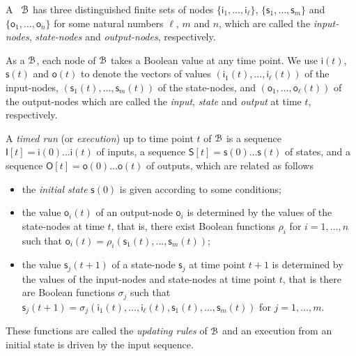 A \BCN\  ${\mathcal{B}}$ has three distinguished finite sets of nodes $\{\mathsf{i}_1,\ldots, \mathsf{i}_\ell\}$, $\{\mathsf{s}_1,\ldots,\mathsf{s}_m\}$ and $\{\mathsf{o}_1,\ldots, \mathsf{o}_n\}$ for some natural numbers $\ell$, $m$ and $n$, which are called the {\em input-nodes}, {\em state-nodes}  and {\em output-nodes}, respectively. 

As a {\BCN} ${\mathcal{B}}$, each node of   ${\mathcal{B}}$   takes a Boolean value at any time point. We use $\mathsf{i}(t)$, $\mathsf{s}(t)$ and $\mathsf{o}(t)$  to denote the vectors of values $(\mathsf{i}_1(t),\ldots,\mathsf{i}_\ell(t))$ of the input-nodes,  $(\mathsf{s}_1(t),\ldots,\mathsf{s}_m(t))$ of the state-nodes, and $(\mathsf{o}_1,\ldots,\mathsf{o}_\ell(t))$ of the output-nodes  which are called the {\em input}, {\em state} and {\em output} at time $t$, respectively.

A {\em timed run}  (or {\em execution}) up to time point $t$ of  ${\mathcal{B}}$ is a sequence $\mathsf{I}[t] = \mathsf{i}(0)\ldots \mathsf{i}(t)$ of inputs, a sequence $\mathsf{S}[t] = \mathsf{s}(0)\ldots \mathsf{s}(t)$ of states, and a sequence $\mathsf{O}[t] = \mathsf{o}(0)\ldots \mathsf{o}(t)$  of outputs, which are related as follows

\begin{itemize}
\item the {\em initial state} $\mathsf{s}(0)$ is given according to some conditions;
	\item the value $\mathsf{o}_i(t)$ of an output-node $\mathsf{o}_i$  is determined by the values of the state-nodes at time $t$, that is, there exist Boolean functions $\rho_i$ for $i=1,\ldots,n$ such that $\mathsf{o}_i(t)=\rho_i(\mathsf{s}_1(t),\ldots,\mathsf{s}_m(t))$; 
	\item the value $\mathsf{s}_j(t+1)$ of a state-node $\mathsf{s}_j$ at time point $t+1$ is determined by the values of the input-nodes and state-nodes at time point $t$, that is there are Boolean functions $\sigma_j$ such that $\mathsf{s}_j(t+1)=\sigma_j(\mathsf{i}_1(t),\ldots,\mathsf{i}_\ell(t),\mathsf{s}_1(t),\ldots,\mathsf{s}_m(t))$ for $j=1,\ldots,m$.
\end{itemize}
 These functions are called the {\em updating rules} of ${\mathcal{B}}$ and an execution from an initial state is driven by the input sequence.
 
